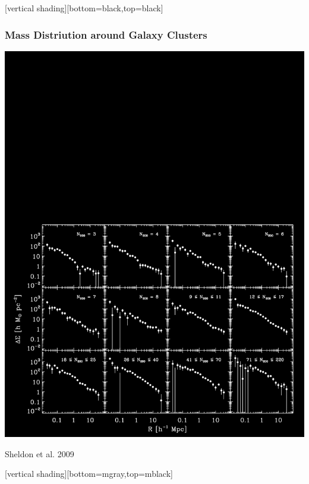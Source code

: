 \documentclass{beamer}
\begin{document}
{
    [vertical shading][bottom=black,top=black]


    \frame
    {
        \frametitle{Mass Distriution around Galaxy Clusters}

        \begin{center}
            \includegraphics[trim=0 0 0 800,clip,width=\textwidth]{maxbcg_sample21-22_ngals200_12_jackknife_icolor.png}
        \end{center}
        \hfill {\color{gold} Sheldon et al. 2009}
    }
    [vertical shading][bottom=mgray,top=mblack]
}
\end{document}
